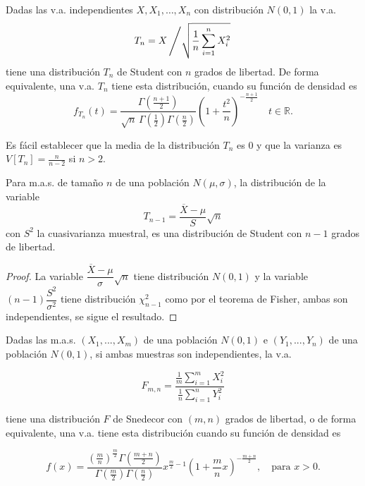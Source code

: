 \begin{definición}
Dadas las v.a. independientes $X, X_1, \ldots, X_n$ con distribución $N(0,1)$ la v.a.
\[
	T_n = X \left/ \sqrt{\frac{1}{n} \sum_{i=1}^n X_i^2} \right.
\]
tiene una distribución $T_n$ de Student con $n$ grados de libertad. De forma
equivalente, una v.a. $T_n$ tiene esta distribución, cuando su función de
densidad es
\begin{equation}
	\label{1.5.3.3}
	f_{T_n}(t) = \frac{\Gamma\left( \frac{n+1}{2} \right)}{\sqrt{n} \, \Gamma\left( \frac{1}{2} \right) \Gamma\left( \frac{n}{2} \right)} \left( 1 + \frac{t^2}{n} \right)^{-\frac{n+1}{2}} \quad t \in \mathbb{R}.
\end{equation}

Es fácil establecer que la media de la distribución $T_n$ es $0$ y que la
varianza es $V[T_n] = \frac{n}{n-2}$ si $n > 2$.
\end{definición}

\begin{corolario}
	Para m.a.s. de tamaño $n$ de una población $N(\mu, \sigma)$, la distribución de la variable
	\[
		T_{n-1} = \frac{\overline{X} - \mu}{S} \sqrt{n}
	\]
	con $S^2$ la cuasivarianza muestral, es una distribución de Student con $n - 1$
	grados de libertad.
\end{corolario}

\begin{proof}
	La variable $\dfrac{\overline{X} - \mu}{\sigma} \sqrt{n}$ tiene distribución $N(0,1)$ y la variable $(n - 1) \dfrac{S^2}{\sigma^2}$ tiene distribución $\chi^2_{n-1}$ como por el teorema de Fisher, ambas son independientes, se sigue el resultado.
\end{proof}

\begin{definición} 
Dadas las m.a.s. \( (X_1, ..., X_m) \) de una población \( N(0,1) \) e \( (Y_1, ..., Y_n) \) de una población \( N(0,1) \), si ambas muestras son independientes, la v.a.

\[
	F_{m,n} = \frac{\frac{1}{m} \sum\limits_{i=1}^{m} X_i^2}{\frac{1}{n} \sum\limits_{i=1}^{n} Y_i^2}
\]

tiene una distribución \( F \) de Snedecor con \( (m,n) \) grados de libertad,
o de forma equivalente, una v.a. tiene esta distribución cuando su función de
densidad es

\[
	f(x) = \frac{\left(\frac{m}{n}\right)^{\frac{m}{2}} \Gamma\left(\frac{m+n}{2}\right)}{\Gamma\left(\frac{m}{2}\right) \Gamma\left(\frac{n}{2}\right)} x^{\frac{m}{2}-1} \left( 1 + \frac{m}{n} x \right)^{-\frac{m+n}{2}}, \quad \text{para } x > 0.
\]

\end{definición}

